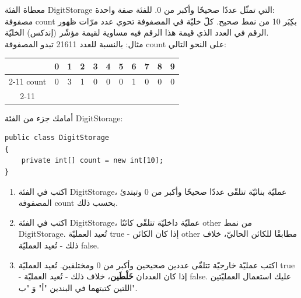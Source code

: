 \documentclass[14pt]{extarticle}
\begin{document}
معطاة الفئة \textenglish{DigitStorage} التي تمثّل عددًا صحيحًا وأكبر من 0. للفئة صفة واحدة: \\
مصفوفة \textenglish{count} بكِبَر 10 من نمط صحيح. كلّ خليّة في المصفوفة تحوي عدد مرّات ظهور الرقم في العدد الذي قيمة هذا الرقم فيه مساوية لقيمة مؤشّر (إندكس) الخليّة. \\
مثال: بالنسبة للعدد 21611 تبدو المصفوفة \textenglish{count} على النحو التالي:

{\small
\begin{english}
\begin{center}
\renewcommand{\arraystretch}{1.5}
\setlength{\tabcolsep}{10pt}
\begin{tabular}{c | c | c | c | c | c | c | c | c | c | c |}
\multicolumn{1}{c}{} & \multicolumn{1}{c}{0} & \multicolumn{1}{c}{1} & \multicolumn{1}{c}{2} & \multicolumn{1}{c}{3} & \multicolumn{1}{c}{4} & \multicolumn{1}{c}{5} & \multicolumn{1}{c}{6} & \multicolumn{1}{c}{7} & \multicolumn{1}{c}{8} & \multicolumn{1}{c}{9} \\
\cline{2-11}
\textenglish{count} & 0 & 3 & 1 & 0 & 0 & 0 & 1 & 0 & 0 & 0 \\
\cline{2-11}
\end{tabular}
\end{center}
\end{english}
}
أمامك جزء من الفئة \textenglish{DigitStorage}:

\begin{english}
\begin{verbatim}
public class DigitStorage
{
    private int[] count = new int[10];
}
\end{verbatim}
\end{english}

\begin{enumerate}[label=\textbf{(\Alph*)}]
    \item اكتب في الفئة \textenglish{DigitStorage}، عمليّة بنائيّة تتلقّى عددًا صحيحًا وأكبر من 0 وتبتدئ المصفوفة \textenglish{count} بحسب ذلك.

    \item اكتب في الفئة \textenglish{DigitStorage}، عمليّة داخليّة تتلقّى كائنًا \textenglish{other} من نمط \\ \textenglish{DigitStorage}. تُعيد العمليّة \textenglish{true} - إذا كان الكائن \textenglish{other} مطابقًا للكائن الحاليّ، خلاف ذلك - تُعيد العمليّة \textenglish{false}.

    \item اكتب عمليّة خارجيّة تتلقّى عددين صحيحين وأكبر من 0 ومختلفين. تُعيد العمليّة \textenglish{true} - إذا كان العددان \textbf{خَلْطَين}، خلاف ذلك - تُعيد العمليّة \textenglish{false}. عليك استعمال العمليّتين اللتين كتبتهما في البندين "أ" وَ "ب".
\end{enumerate}
\end{document}

